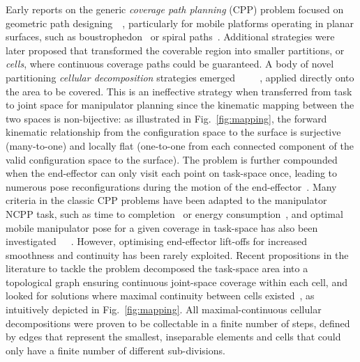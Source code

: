 \documentclass[journal]{IEEEtran}
\begin{document}
Early reports on the generic \textit{coverage path planning} (CPP) problem focused on geometric path designing~\cite{Kaljaca2020Coverage}~\cite{Oriolo2005Motion}, particularly for mobile platforms operating in planar surfaces, such as boustrophedon~\cite{choset1998coverage} or spiral paths~\cite{hassan2018a}. 
Additional strategies were later proposed that transformed the coverable region into smaller partitions, or \textit{cells}, where continuous coverage paths could be guaranteed. A body of novel partitioning \textit{cellular decomposition} strategies emerged~\cite{Acar2002Morse}~\cite{choset2000exact}~\cite{huang2001optimal}~\cite{Atkar2009Hierarchical}~\cite{Hassan2017Simultaneous}, applied directly onto the area to be covered. This is an ineffective strategy when transferred from task to joint space for manipulator planning since the kinematic mapping between the two spaces is non-bijective: as illustrated in Fig.~\ref{fig:mapping}, the forward kinematic relationship from the configuration space to the surface is surjective (many-to-one) and locally flat (one-to-one from each connected component of the valid configuration space to the surface). 
The problem is further compounded when the end-effector can only visit each point on task-space once, leading to numerous pose reconfigurations during the motion of the end-effector~\cite{rososhansky2011coverage}.
Many criteria in the classic CPP problems have been adapted to the manipulator NCPP task, such as time to completion~\cite{lu2020time} or energy consumption~\cite{mei2004energy}, and optimal mobile manipulator pose for a given coverage in task-space has also been investigated~\cite{paus2017a}~\cite{Fan2021Base}~\cite{Kalawoun2018Optimal}. However, optimising  end-effector lift-offs for increased smoothness and continuity has been rarely exploited. 
Recent propositions in the literature to tackle the problem decomposed the task-space area into a topological graph ensuring continuous joint-space coverage within each cell, and looked for solutions where maximal continuity between cells existed~\cite{Yang2020Cellular}, as intuitively depicted in Fig.~\ref{fig:mapping}. 
All maximal-continuous cellular decompositions were proven to be collectable in a finite number of steps, defined by edges that represent the smallest, inseparable elements and cells that could only have a finite number of different sub-divisions.  
\end{document}

